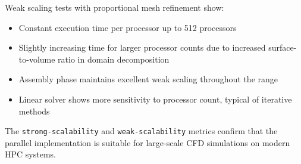 Weak scaling tests with proportional mesh refinement show:
\begin{itemize}
\item Constant execution time per processor up to 512 processors
\item Slightly increasing time for larger processor counts due to increased surface-to-volume ratio in domain decomposition
\item Assembly phase maintains excellent weak scaling throughout the range
\item Linear solver shows more sensitivity to processor count, typical of iterative methods
\end{itemize}

The \texttt{strong-scalability} and \texttt{weak-scalability} metrics confirm that the parallel implementation is suitable for large-scale CFD simulations on modern HPC systems.

